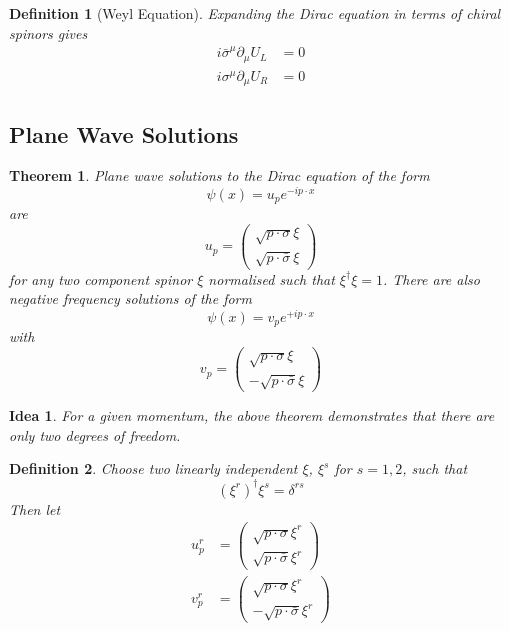 \documentclass{article}
\newtheorem{theorem}{Theorem}[subsection]
\newtheorem{definition}{Definition}[subsection]
\newtheorem*{idea}{Idea}
\newcommand{\del}{\partial}
\begin{document}
\begin{definition}[Weyl Equation]
Expanding the Dirac equation in terms of chiral spinors gives 
\begin{align*}
    i \bar{\sigma}^\mu \del_\mu U_L &= 0 \\
    i \sigma^\mu \del_\mu U_R &= 0
\end{align*}
\end{definition}

\subsection{Plane Wave Solutions}

\begin{theorem}
Plane wave solutions to the Dirac equation of the form 
\[
\psi(x) = u_p e^{-i p\cdot x }
\]
are
\[
u_p = \begin{pmatrix} \sqrt{p\cdot\sigma} \xi \\ \sqrt{p\cdot\bar{\sigma}} \xi \end{pmatrix}
\]
for any two component spinor $\xi$ normalised such that $\xi^\dagger \xi = 1$. There are also negative frequency solutions of the form 
\[
\psi(x) = v_p e^{+i p\cdot x }
\]
with 
\[
v_p = \begin{pmatrix} \sqrt{p\cdot\sigma} \xi \\ -\sqrt{p\cdot\bar{\sigma}} \xi \end{pmatrix}
\]
\end{theorem}

\begin{idea}
For a given momentum, the above theorem demonstrates that there are only two degrees of freedom. 
\end{idea}

\begin{definition}
Choose two linearly independent $\xi$, $\xi^s$ for $s=1,2$, such that 
\[
(\xi^r)^\dagger \xi^s = \delta^{rs}
\]
Then let 
\begin{align*}
    u_p^r &= \begin{pmatrix} \sqrt{p\cdot\sigma} \xi^r \\ \sqrt{p\cdot\bar{\sigma}} \xi^r \end{pmatrix} \\
    v_p^r &= \begin{pmatrix} \sqrt{p\cdot\sigma} \xi^r \\ -\sqrt{p\cdot\bar{\sigma}} \xi^r \end{pmatrix} \\
\end{align*}
\end{definition}
\end{document}

